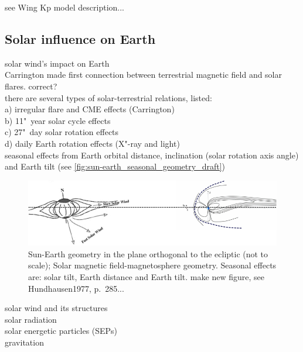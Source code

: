 see Wing Kp model description...\\


\subsection{Solar influence on Earth}
\label{sec:solar_influence_on_earth}

solar wind's impact on Earth\\

Carrington made first connection between terrestrial magnetic field and solar flares. correct?\\

there are several types of solar-terrestrial relations, \citet{Bartels1962} listed:\\	%
a) irregular flare and CME effects (Carrington)\\
b) 11"~year solar cycle effects\\
c) 27"~day solar rotation effects\\
d) daily Earth rotation effects (X"-ray and light)\\

seasonal effects from Earth orbital distance, inclination (solar rotation axis angle) and Earth tilt (see \autoref{fig:sun-earth_seasonal_geometry_draft})\\
\begin{figure}[htb]
	\centering
	\includegraphics[width=\textwidth]{figures_of_mine/schemata/sun-earth_seasonal_geometry_draft.png}
	\caption[]
	{Sun-Earth geometry in the plane orthogonal to the ecliptic (not to scale); Solar magnetic field-magnetosphere geometry. Seasonal effects are: solar tilt, Earth distance and Earth tilt. make new figure, see Hundhausen1977, p.~285...}
	\label{fig:sun-earth_seasonal_geometry_draft}
\end{figure}

solar wind and its structures\\
solar radiation\\
solar energetic particles (SEPs)\\
gravitation\\

